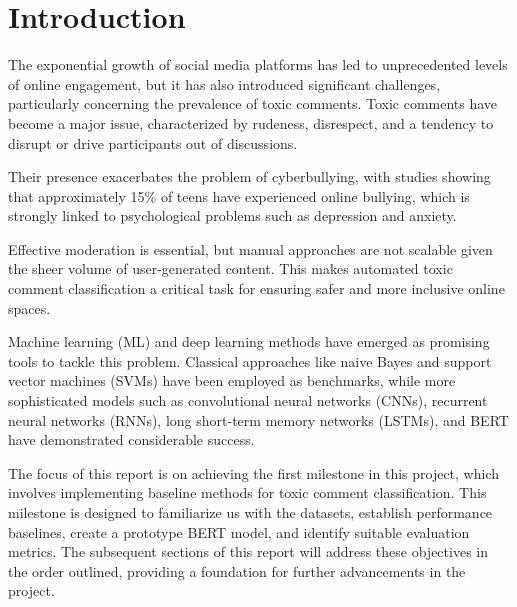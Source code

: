 \section{Introduction}

The exponential growth of social media platforms has led to unprecedented levels of online engagement, but it has also introduced significant challenges, particularly concerning the prevalence of toxic comments. Toxic comments have become a major issue, characterized by rudeness, disrespect, and a tendency to disrupt or drive participants out of discussions. \cite{Androcec2020}

Their presence exacerbates the problem of cyberbullying, with studies showing that approximately 15\% of teens have experienced online bullying, which is strongly linked to psychological problems such as depression and anxiety. \cite{Zaheri2020} 

Effective moderation is essential, but manual approaches are not scalable given the sheer volume of user-generated content. This makes automated toxic comment classification a critical task for ensuring safer and more inclusive online spaces.

Machine learning (ML) and deep learning methods have emerged as promising tools to tackle this problem. Classical approaches like naive Bayes and support vector machines (SVMs) have been employed as benchmarks, while more sophisticated models such as convolutional neural networks (CNNs), recurrent neural networks (RNNs), long short-term memory networks (LSTMs), and BERT have demonstrated considerable success. \cite{Androcec2020}

The focus of this report is on achieving the first milestone in this project, which involves implementing baseline methods for toxic comment classification. This milestone is designed to familiarize us with the datasets, establish performance baselines, create a prototype BERT model, and identify suitable evaluation metrics. The subsequent sections of this report will address these objectives in the order outlined, providing a foundation for further advancements in the project.
